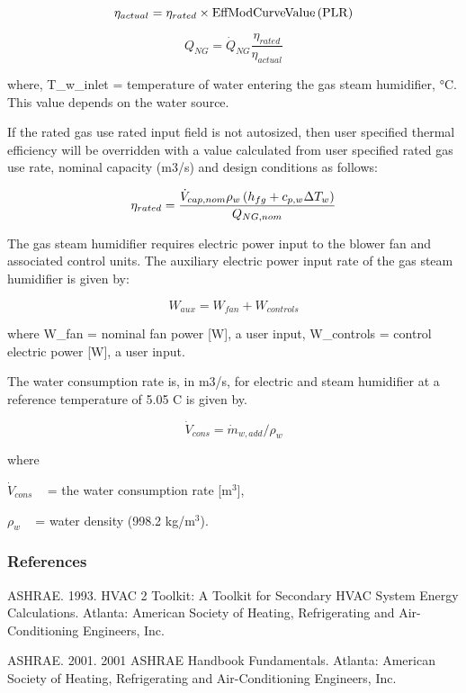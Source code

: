 \begin{equation}
\eta_{actual} = \eta_{rated} \times \rm{EffModCurveValue}\left(PLR\right)
\end{equation}

\begin{equation}
Q_{NG} = \dot{Q}_{NG}\frac{\eta_{rated}}{\eta_{actual}}
\end{equation}

where, T\_w\_inlet = temperature of water entering the gas steam humidifier, °C. This value depends on the water source.

If the rated gas use rated input field is not autosized, then user specified thermal efficiency will be overridden with a value calculated from user specified rated gas use rate, nominal capacity (m3/s) and design conditions as follows:

\begin{equation}
 \eta_{rated} = \frac{\dot{V}_{cap,nom} \rho_w \left(h_{fg}+c_{p,w}\Delta T_w\right)}{Q_{NG,nom}}
\end{equation}

The gas steam humidifier requires electric power input to the blower fan and associated control units. The auxiliary electric power input rate of the gas steam humidifier is given by:

\begin{equation}
W_{aux} = W_{fan} + W_{controls}
\end{equation}

where W\_fan = nominal fan power {[}W{]}, a user input, W\_controls = control electric power {[}W{]}, a user input.

The water consumption rate is, in m3/s, for electric and steam humidifier at a reference temperature of 5.05 C is given by.

\begin{equation}
{\dot V_{cons}} = {\dot m_{w,add}}/{\rho_w}
\end{equation}

where

\({\dot V_{cons}}\) ~ = the water consumption rate {[}m\(^{3}\){]},

\({\rho_w}\) ~ = water density (998.2 kg/m\(^{3}\)).

\subsubsection{References}\label{references-003}

ASHRAE. 1993. HVAC 2 Toolkit: A Toolkit for Secondary HVAC System Energy Calculations. Atlanta: American Society of Heating, Refrigerating and Air-Conditioning Engineers, Inc.

ASHRAE. 2001. 2001 ASHRAE Handbook Fundamentals. Atlanta: American Society of Heating, Refrigerating and Air-Conditioning Engineers, Inc.
